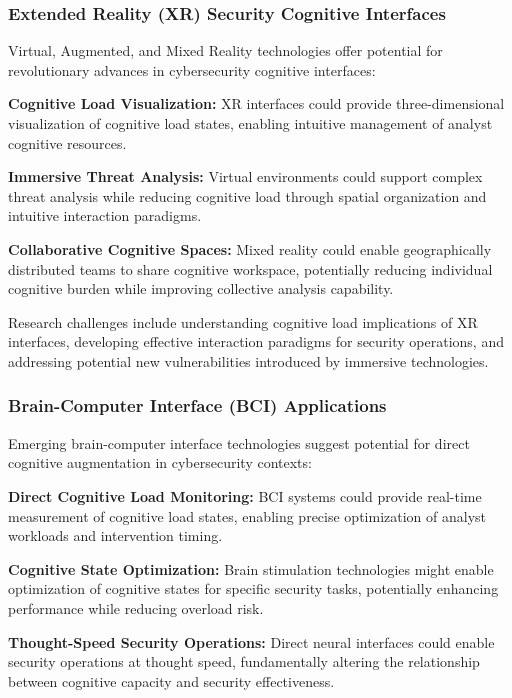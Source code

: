 \documentclass[11pt,a4paper]{article}
\begin{document}
\subsubsection{Extended Reality (XR) Security Cognitive Interfaces}

Virtual, Augmented, and Mixed Reality technologies offer potential for revolutionary advances in cybersecurity cognitive interfaces:

\textbf{Cognitive Load Visualization:} XR interfaces could provide three-dimensional visualization of cognitive load states, enabling intuitive management of analyst cognitive resources.

\textbf{Immersive Threat Analysis:} Virtual environments could support complex threat analysis while reducing cognitive load through spatial organization and intuitive interaction paradigms.

\textbf{Collaborative Cognitive Spaces:} Mixed reality could enable geographically distributed teams to share cognitive workspace, potentially reducing individual cognitive burden while improving collective analysis capability.

Research challenges include understanding cognitive load implications of XR interfaces, developing effective interaction paradigms for security operations, and addressing potential new vulnerabilities introduced by immersive technologies.

\subsubsection{Brain-Computer Interface (BCI) Applications}

Emerging brain-computer interface technologies suggest potential for direct cognitive augmentation in cybersecurity contexts:

\textbf{Direct Cognitive Load Monitoring:} BCI systems could provide real-time measurement of cognitive load states, enabling precise optimization of analyst workloads and intervention timing.

\textbf{Cognitive State Optimization:} Brain stimulation technologies might enable optimization of cognitive states for specific security tasks, potentially enhancing performance while reducing overload risk.

\textbf{Thought-Speed Security Operations:} Direct neural interfaces could enable security operations at thought speed, fundamentally altering the relationship between cognitive capacity and security effectiveness.
\end{document}
